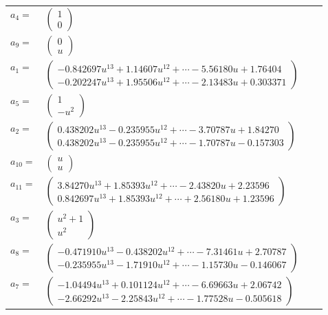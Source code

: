 \documentclass[1p]{elsarticle_modified}
\theoremstyle{definition}
\begin{document}
\begin{tabular}{m{7pt} m{180pt} m{7pt} m{180pt} }
\flushright $a_{4}=$&$\begin{pmatrix}1\\0\end{pmatrix}$ \\
\flushright $a_{9}=$&$\begin{pmatrix}0\\u\end{pmatrix}$ \\
\flushright $a_{1}=$&$\begin{pmatrix}-0.842697 u^{13}+1.14607 u^{12}+\cdots-5.56180 u+1.76404\\-0.202247 u^{13}+1.95506 u^{12}+\cdots-2.13483 u+0.303371\end{pmatrix}$ \\
\flushright $a_{5}=$&$\begin{pmatrix}1\\- u^2\end{pmatrix}$ \\
\flushright $a_{2}=$&$\begin{pmatrix}0.438202 u^{13}-0.235955 u^{12}+\cdots-3.70787 u+1.84270\\0.438202 u^{13}-0.235955 u^{12}+\cdots-1.70787 u-0.157303\end{pmatrix}$ \\
\flushright $a_{10}=$&$\begin{pmatrix}u\\u\end{pmatrix}$ \\
\flushright $a_{11}=$&$\begin{pmatrix}3.84270 u^{13}+1.85393 u^{12}+\cdots-2.43820 u+2.23596\\0.842697 u^{13}+1.85393 u^{12}+\cdots+2.56180 u+1.23596\end{pmatrix}$ \\
\flushright $a_{3}=$&$\begin{pmatrix}u^2+1\\u^2\end{pmatrix}$ \\
\flushright $a_{8}=$&$\begin{pmatrix}-0.471910 u^{13}-0.438202 u^{12}+\cdots-7.31461 u+2.70787\\-0.235955 u^{13}-1.71910 u^{12}+\cdots-1.15730 u-0.146067\end{pmatrix}$ \\
\flushright $a_{7}=$&$\begin{pmatrix}-1.04494 u^{13}+0.101124 u^{12}+\cdots-6.69663 u+2.06742\\-2.66292 u^{13}-2.25843 u^{12}+\cdots-1.77528 u-0.505618\end{pmatrix}$ \\

\end{tabular}
\end{document}
